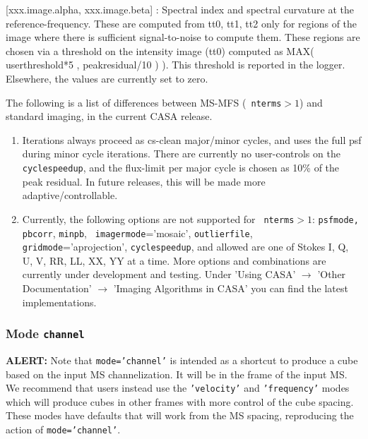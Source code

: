                [xxx.image.alpha, xxx.image.beta] : Spectral index and
               spectral curvature at the reference-frequency. These
               are computed from tt0, tt1, tt2 only for regions of the
               image where there is sufficient signal-to-noise to
               compute them. These regions are chosen via a threshold
               on the intensity image (tt0) computed as MAX(
               userthreshold*5 , peakresidual/10 ) ). This threshold
               is reported in the logger.  Elsewhere, the values are
               currently set to zero.


The following is a list of differences between MS-MFS ({\tt
                 nterms}$>1$) and standard imaging, in the current
               CASA release.

\begin{enumerate}


\item Iterations always proceed as cs-clean major/minor cycles, and
  uses the full psf during minor cycle iterations. There are currently
  no user-controls on the {\tt cyclespeedup}, and the flux-limit per major cycle is
  chosen as 10\% of the peak residual. In future releases, this will
  be made more adaptive/controllable.

\item Currently, the following options are not supported for {\tt
    nterms}$>1$: {\tt psfmode,} {\tt pbcorr}, {\tt minpb}, {\tt
    imagermode}='mosaic', {\tt outlierfile}, {\tt
    gridmode}='aprojection', {\tt cyclespeedup}, and allowed are one
  of Stokes I, Q, U, V, RR, LL, XX, YY at a time. More options and combinations are currently under
  development and testing. Under 'Using CASA' $\rightarrow$ 'Other
  Documentation' $\rightarrow$ 'Imaging Algorithms in CASA' you can
  find the latest implementations. 

\end{enumerate}


\subsubsection{Mode {\tt channel} }
\label{section:im.pars.mode.channel}

{\bf ALERT:} Note that {\tt mode='channel'} is intended as a shortcut
to produce a cube based on the input MS channelization.  It will be in
the frame of the input MS.  We recommend that users instead use the
{\tt 'velocity'} and {\tt 'frequency'} modes which will produce cubes
in other frames with more control of the cube spacing.  These modes
have defaults that will work from the MS spacing, reproducing the
action of {\tt mode='channel'}.

